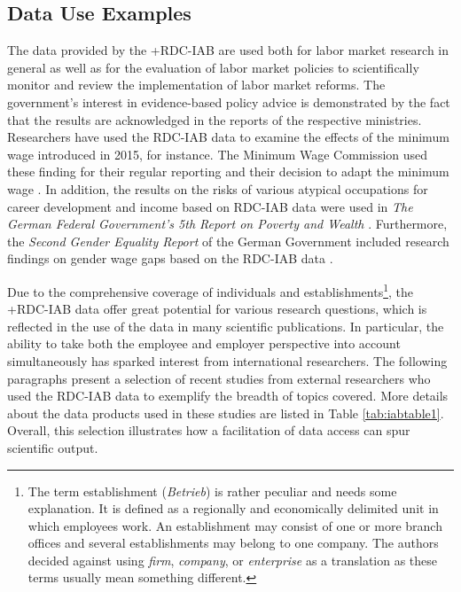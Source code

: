 \documentclass[
]{book}
\begin{document}
\hypertarget{data-use-examples}{%
\subsection{Data Use Examples}\label{data-use-examples}}

The data provided by the +RDC-IAB\textbar{} are used both for labor market research in general as well as for the evaluation of labor market policies to scientifically monitor and review the implementation of labor market reforms. The government's interest in evidence-based policy advice is demonstrated by the fact that the results are acknowledged in the reports of the respective ministries. Researchers have used the RDC-IAB data to examine the effects of the minimum wage introduced in 2015, for instance. The Minimum Wage Commission used these finding for their regular reporting and their decision to adapt the minimum wage \citep{mindestlohnkommission2016, mindestlohnkommission2016a}. In addition, the results on the risks of various atypical occupations for career development and income based on RDC-IAB data were used in \emph{The German Federal Government's 5th Report on Poverty and Wealth} \citep{bmasbundesministeriumfurarbeitundsoziales2017, rwirheinisch-westfalischesinstitutfurwirtschaftsforschung2016}. Furthermore, the \emph{Second Gender Equality Report} of the German Government included research findings on gender wage gaps based on the RDC-IAB data \citep{bmfsfjbundesministeriumfurfamilieseniorenfrauenundjugend2017, boll2015}.

Due to the comprehensive coverage of individuals and establishments\footnote{The term establishment (\emph{Betrieb}) is rather peculiar and needs some explanation. It is defined as a regionally and economically delimited unit in which employees work. An establishment may consist of one or more branch offices and several establishments may belong to one company. The authors decided against using \emph{firm}, \emph{company}, or \emph{enterprise} as a translation as these terms usually mean something different.}, the +RDC-IAB\textbar{} data offer great potential for various research questions, which is reflected in the use of the data in many scientific publications. In particular, the ability to take both the employee and employer perspective into account simultaneously has sparked interest from international researchers. The following paragraphs present a selection of recent studies from external researchers who used the RDC-IAB data to exemplify the breadth of topics covered. More details about the data products used in these studies are listed in Table \ref{tab:iabtable1}. Overall, this selection illustrates how a facilitation of data access can spur scientific output.
\end{document}
